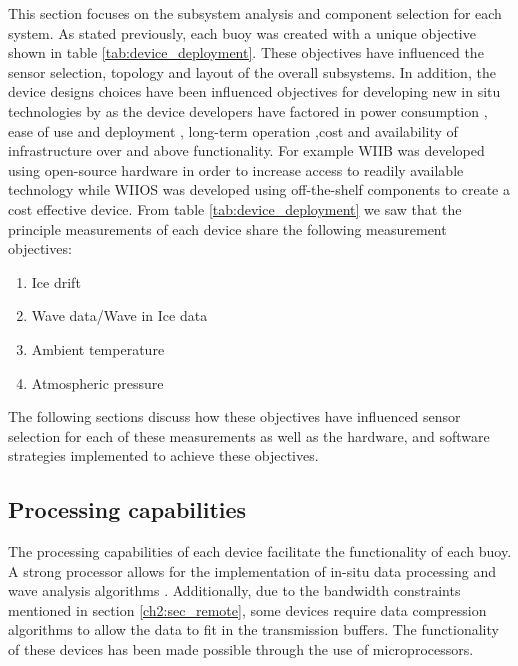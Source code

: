 This section focuses on the subsystem analysis and component selection for each system. As stated previously, each buoy was created with a unique objective shown in table \ref{tab:device_deployment}. These objectives have influenced the sensor selection, topology and layout of the overall subsystems. In addition, the device designs choices have been influenced objectives for developing new in situ technologies by \textcite{kennicutt2016delivering} as the device developers have factored in power consumption \cite{kohout2015device}, ease of use and deployment \cite{rabault2019open}, long-term operation \cite{doble2017robust},cost \cite{planck2019evolution,rabault2019open} and availability of infrastructure \cite{doble2017robust} over and above functionality. For example WIIB was developed using open-source hardware \cite{rabault2019open} in order to increase access to readily available technology while WIIOS was developed using off-the-shelf components \cite{kohout2015device} to create a cost effective device. From table \ref{tab:device_deployment} we saw that the principle measurements of each device share the following measurement objectives:

\begin{enumerate}
	\item Ice drift
	\item Wave data/Wave in Ice data
	\item Ambient temperature
	\item Atmospheric pressure 
\end{enumerate}

The following sections discuss how these objectives have influenced sensor selection for each of these measurements as well as the hardware, and software strategies implemented to achieve these objectives.

\subsection{Processing capabilities}

The processing capabilities of each device facilitate the functionality of each buoy. A strong processor allows for the implementation of in-situ data processing and wave analysis algorithms \cite{kohout2015device,rabault2019open}. Additionally, due to the bandwidth constraints mentioned in section \ref{ch2:sec_remote}, some devices require data compression algorithms to allow the data to fit in the transmission buffers. The functionality of these devices has been made possible through the use of microprocessors.

